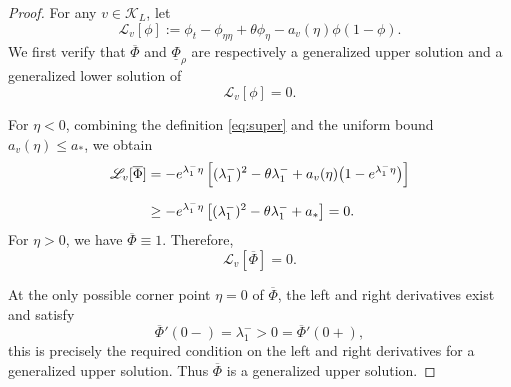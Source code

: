 \documentclass[preprint,sort&compress,final,12pt]{elsarticle}
\numberwithin{equation}{section}
\begin{document}
\begin{proof}
For any $v\in\mathcal K_L$, let
\begin{equation*}
\mathscr L_v[\phi]
:=\phi_t-\phi_{\eta\eta}+\theta\phi_{\eta}-a_v(\eta)\phi(1-\phi).
\end{equation*}
We first verify that $\overline\Phi$ and $\underline\Phi_\rho$ are respectively a generalized upper solution and a generalized lower solution of
\begin{equation*}
\mathscr L_v[\phi]=0.
\end{equation*}

For $\eta<0$, combining the definition \eqref{eq:super} and the uniform bound $a_v(\eta)\le a_*$, we obtain
\begin{align*}
\mathscr L_v[\overline\Phi]
&=-e^{\lambda_1^{-}\eta}
\left[(\lambda_1^{-})^2-\theta\lambda_1^{-}
+a_v(\eta)\bigl(1-e^{\lambda_1^{-}\eta}\bigr)
\right]\notag\\[0.2cm]
&\ge -e^{\lambda_1^{-}\eta}
\left[(\lambda_1^{-})^2-\theta\lambda_1^{-}+a_*
\right]=0.
\end{align*}
For $\eta>0$, we have $\overline\Phi\equiv1$. Therefore,
\begin{equation*}
\mathscr L_v[\overline\Phi]=0.
\end{equation*}

At the only possible corner point $\eta=0$ of $\overline\Phi$, the left and right derivatives exist and satisfy
\begin{equation*}
\overline\Phi'(0-)=\lambda_1^->0=\overline\Phi'(0+),
\end{equation*}
this is precisely the required condition on the left and right derivatives for a generalized upper solution.
Thus $\overline\Phi$ is a generalized upper solution.






\end{proof}
\end{document}
